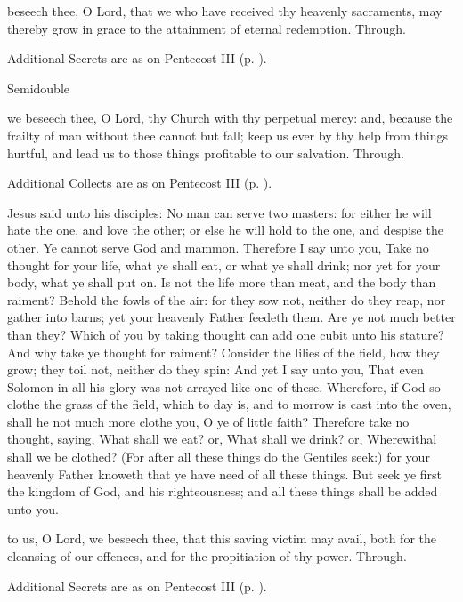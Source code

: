 \postcommunion
{} beseech thee, O Lord, that we who have received thy heavenly sacraments, may thereby grow in grace to the attainment of eternal redemption. Through.
\begin{rubric}
    Additional Secrets are as on Pentecost III (p. \pageref{PentecostIII}).
\end{rubric}

\begin{inhead}
{Semidouble}
\end{inhead}

\collect
{} we beseech thee, O Lord, thy Church with thy perpetual mercy: and, because the frailty of man without thee cannot but fall; keep us ever by thy help from things hurtful, and lead us to those things profitable to our salvation. Through.
\begin{rubric}
    Additional Collects are as on Pentecost III (p. \pageref{PentecostIII}).
\end{rubric}

 Jesus said unto his disciples: No man can serve two masters: for either he will hate the one, and love the other; or else he will hold to the one, and despise the other. Ye cannot serve God and mammon. Therefore I say unto you, Take no thought for your life, what ye shall eat, or what ye shall drink; nor yet for your body, what ye shall put on. Is not the life more than meat, and the body than raiment? Behold the fowls of the air: for they sow not, neither do they reap, nor gather into barns; yet your heavenly Father feedeth them. Are ye not much better than they? Which of you by taking thought can add one cubit unto his stature? And why take ye thought for raiment? Consider the lilies of the field, how they grow; they toil not, neither do they spin: And yet I say unto you, That even Solomon in all his glory was not arrayed like one of these. Wherefore, if God so clothe the grass of the field, which to day is, and to morrow is cast into the oven, shall he not much more clothe you, O ye of little faith? Therefore take no thought, saying, What shall we eat? or, What shall we drink? or, Wherewithal shall we be clothed? (For after all these things do the Gentiles seek:) for your heavenly Father knoweth that ye have need of all these things. But seek ye first the kingdom of God, and his righteousness; and all these things shall be added unto you.

\secret
{} to us, O Lord, we beseech thee, that this saving victim may avail, both for the cleansing of our offences, and for the propitiation of thy power. Through.
\begin{rubric}
    Additional Secrets are as on Pentecost III (p. \pageref{PentecostIII}).
\end{rubric}

